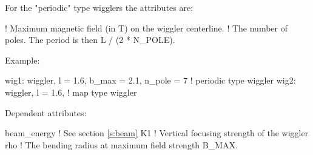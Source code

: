 For the "periodic" type wigglers the attributes are: 
\begin{example}	
    ! Maximum magnetic field (in T) on the wiggler centerline. 
   ! The number of poles. The period is then L / (2 * N_POLE). 
\end{example}

\vskip0.05in \noindent
Example:
\begin{example}
  wig1: wiggler, l = 1.6, b_max = 2.1, n_pole = 7  ! periodic type wiggler
  wig2: wiggler, l = 1.6,                          ! map type wiggler

\end{example}

\vskip0.05in \noindent
Dependent attributes:
\begin{example}
  beam\_energy  ! See section \ref{s:beam}
  K1            ! Vertical focusing strength of the wiggler 
  rho           ! The bending radius at maximum field strength B_MAX. 
\end{example}
\noindent

